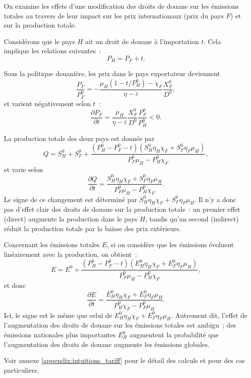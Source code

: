 On examine les effets d'une modification des droits de douane sur les émissions totales au travers de leur impact sur les prix internationaux (prix du pays $F$) et sur la production totale.

Considérons que le pays $H$ ait un droit de douane à l'importation $t$. Cela implique les relations suivantes~:
\begin{equation}
    P_H = P_F + t.
\end{equation}

Sous la politique douanière, les prix dans le pays exportateur deviennent
\begin{equation}
    \frac{P_F}{P_F^0} = -\frac{\mu_H (1 - t/P_H^0) - \chi_F}{\eta - \varepsilon}\frac{X_F^0}{D^0},
\end{equation}
et varient négativement selon $t$~:
\begin{equation}
    \frac{\partial P_F}{\partial t} = \frac{\mu_H}{\eta - \varepsilon} \frac{X_F^0}{D^0} \frac{P_F^0}{P_H^0} < 0.
\end{equation}

La production totale des deux pays est donnée par
\begin{equation}
    Q = S_H^0 + S_F^0 + \frac{(P_H^0 - P_F^0 - t)(S_H^0 \eta_H \chi_F + S_F^0 \eta_F \mu_H)}{P_F^0 \mu_H - P_H^0 \chi_F},
\end{equation}
et varie selon
\begin{equation}
    \frac{\partial Q}{\partial t} = \frac{S_H^0 \eta_H \chi_F + S_F^0 \eta_F \mu_H}{P_F^0 \mu_H - P_H^0 \chi_F}.
\end{equation}
Le signe de ce changement est déterminé par $S_H^0 \eta_H \chi_F + S_F^0 \eta_F \mu_H$. Il n'y a donc pas d'effet clair des droits de douane sur la production totale~: un premier effet (direct) augmente la production dans le pays $H$, tandis qu'un second (indirect) réduit la production totale par la baisse des prix extérieurs.

Concernant les émissions totales $E$, si on considère que les émissions évoluent linéairement avec la production, on obtient~:
\begin{equation}
    E = E^0 + \frac{(P_H^0 - P_F^0 - t)(E_H^0 \eta_H \chi_F + E_F^0 \eta_F \mu_H)}{P_F^0 \mu_H - P_H^0 \chi_F},
\end{equation}
et donc
\begin{equation}\label{eq:eq_intuition_delta_em}
    \frac{\partial E}{\partial t} = \frac{E_H^0 \eta_H \chi_F + E_F^0 \eta_F \mu_H}{P_H^0 \chi_F - P_F^0 \mu_H}.
\end{equation}
Ici, le signe est le même que celui de $E_H^0 \eta_H \chi_F + E_F^0 \eta_F \mu_H$. Autrement dit, l'effet de l'augmentation des droits de douane sur les émissions totales est ambigu~; des émissions nationales plus importantes $E_H^0$ augmentent la probabilité que l'augmentation des droits de douane augmente les émissions globales.

Voir annexe \ref{appendix:intuitions_tariff} pour le détail des calculs et pour des cas particuliers.
